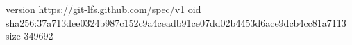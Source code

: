 version https://git-lfs.github.com/spec/v1
oid sha256:37a713dee0324b987c152c9a4ceadb91ce07dd02b4453d6ace9dcb4cc81a7113
size 349692
